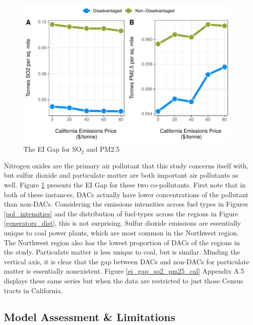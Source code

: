 \begin{figure}
    \centering
    \caption{The EI Gap for SO$_2$ and PM2.5 \label{ei_gap_so2_pm25}}
    \includegraphics[width=\textwidth]{figures/chapter5_figures/ei_gap_so2_pm25.pdf}
\end{figure}

Nitrogen oxides are the primary air pollutant that this study concerns itself with, but sulfur dioxide and particulate matter are both important air pollutants as well. Figure \ref{ei_gap_so2_pm25} presents the EI Gap for these two co-pollutants. First note that in both of these instances, DACs actually have lower concentrations of the pollutant than non-DACs. Considering the emissions intensities across fuel types in Figures \ref{pol_intensities} and the distribution of fuel-types across the regions in Figure \ref{generators_dist}, this is not surprising. Sulfur dioxide emissions are essentially unique to coal power plants, which are most common in the Northwest region. The Northwest region also has the lowest proportion of DACs of the regions in the study. Particulate matter is less unique to coal, but is similar. Minding the vertical axis, it is clear that the gap between DACs and non-DACs for particulate matter is essentially nonexistent. Figure \ref{ei_gap_so2_pm25_cal} Appendix A.5 displays these same series but when the data are restricted to just those Census tracts in California.


\subsection{Model Assessment \& Limitations}

